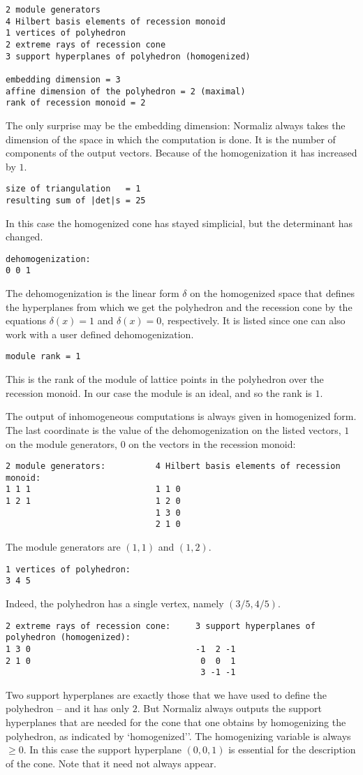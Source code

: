 \documentclass[12pt,a4paper]{scrartcl}
\theoremstyle{definition}
\begin{document}
\begin{Verbatim}
2 module generators
4 Hilbert basis elements of recession monoid
1 vertices of polyhedron
2 extreme rays of recession cone
3 support hyperplanes of polyhedron (homogenized)

embedding dimension = 3
affine dimension of the polyhedron = 2 (maximal)
rank of recession monoid = 2
\end{Verbatim}
The only surprise may be the embedding dimension: Normaliz always takes the dimension of the space in which the computation is done. It is the number of components of the output vectors. Because of the homogenization it has increased by $1$.
\begin{Verbatim}
size of triangulation   = 1
resulting sum of |det|s = 25
\end{Verbatim}
In this case the homogenized cone has stayed simplicial, but the determinant has changed.
\begin{Verbatim}
dehomogenization:
0 0 1 
\end{Verbatim}
The dehomogenization is the linear form $\delta$ on the homogenized space that defines the hyperplanes from which we get the polyhedron and the recession cone by the equations $\delta(x)=1$ and $\delta(x)=0$, respectively. It is listed since one can also work with a user defined dehomogenization.
\begin{Verbatim}
module rank = 1
\end{Verbatim}
This is the rank of the module of lattice points in the polyhedron over the recession monoid. In our case the module is an ideal, and so the rank is $1$.

The output of inhomogeneous computations is always given in homogenized form. The last coordinate is the value of the dehomogenization on the listed vectors, $1$ on the module generators, $0$ on the vectors in the recession monoid:
\begin{Verbatim}
2 module generators:          4 Hilbert basis elements of recession monoid:
1 1 1                         1 1 0
1 2 1                         1 2 0
                              1 3 0
                              2 1 0
\end{Verbatim}
The module generators are $(1,1)$ and $(1,2)$.
\begin{Verbatim}
1 vertices of polyhedron:
3 4 5
\end{Verbatim}
Indeed, the polyhedron has a single vertex, namely $(3/5,4/5)$.
\begin{Verbatim}
2 extreme rays of recession cone:     3 support hyperplanes of polyhedron (homogenized):
1 3 0                                 -1  2 -1
2 1 0                                  0  0  1                                
                                       3 -1 -1
\end{Verbatim}
Two support hyperplanes are exactly those that we have used to define the polyhedron -- and it has only $2$. But Normaliz always outputs the support hyperplanes that are needed for the cone that one obtains by homogenizing the polyhedron, as indicated by `homogenized''. The homogenizing variable is always $\ge 0$. In this case the support hyperplane $(0,0,1)$ is essential for the description of the cone. Note that it need not always appear.
\end{document}
